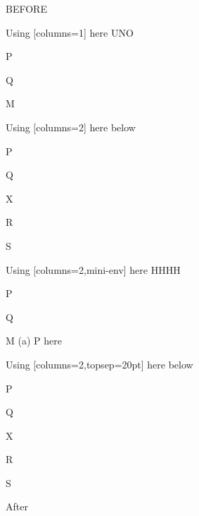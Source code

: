 \documentclass[12pt]{article}
\begin{document}
BEFORE

\begin{enumext}[columns=2]
\item Using [columns=1] here UNO

  \begin{enumext}[columns=1,topsep=20pt,partopsep=20pt]%
     \item  P \item Q \item M %
  \end{enumext}

\item Using [columns=2] here below

\begin{enumext}[columns=2,topsep=20pt,,partopsep=20pt]%
     \item  P \item Q \item X  \item R \item S
  \end{enumext}

\columnbreak

\item Using [columns=2,mini-env] here HHHH

  \begin{enumext}[columns=1,mini-env={0.4\linewidth},topsep=20pt,partopsep=20pt]%
    \item  P \item Q \item M %
    \miniright
    (a) P here
  \end{enumext}

\item Using [columns=2,topsep=20pt] here below

\begin{enumext}[columns=2,topsep=20pt,partopsep=20pt]%
     \item  P \item Q \item X  \item R \item S
  \end{enumext}

\end{enumext}
After
\end{document}
